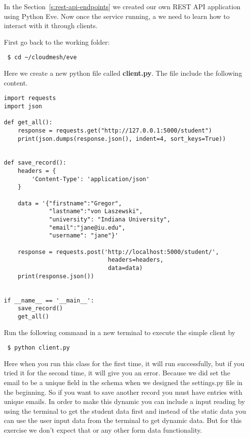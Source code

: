 In the Section~\ref{s:rest-api-endpoints} we created our own REST API application
using Python Eve. Now once the service running, a we need to learn how to
interact with it through clients.

First go back to the working folder:

\begin{lstlisting}
 $ cd ~/cloudmesh/eve
\end{lstlisting}

Here we create a new python file called \textbf{client.py}. The file include the
following content.

\begin{lstlisting}
import requests
import json

def get_all():
    response = requests.get("http://127.0.0.1:5000/student")
    print(json.dumps(response.json(), indent=4, sort_keys=True))


def save_record():
    headers = {
        'Content-Type': 'application/json'
    }

    data = '{"firstname":"Gregor",
             "lastname":"von Laszewski",
             "university": "Indiana University",
             "email":"jane@iu.edu",
             "username": "jane"}'

    response = requests.post('http://localhost:5000/student/',
                              headers=headers,
                              data=data)
    print(response.json())


if __name__ == '__main__':
    save_record()
    get_all()
\end{lstlisting}

Run the following command in a new terminal to execute the simple client by 

\begin{lstlisting}
 $ python client.py
\end{lstlisting}

Here when you run this class for the first time, it will run successfully, but 
if you tried it for the second time, it will give you an error. Because we did 
set the email to be a unique field in the schema when we designed the settings.py
file in the beginning. So if you want to save another record you must have entries
with unique emails. In order to make this dynamic you can include a input reading
by using the terminal to get the student data first and instead of the static
data you can use the user input data from the terminal to get dynamic data. 
But for this exercise we don't expect that or any other form data functionality.

